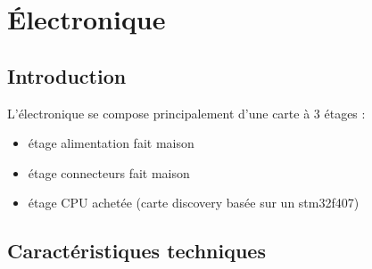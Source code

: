 \chapter{Électronique}

\section{Introduction}

L'électronique se compose principalement d'une carte à 3 étages :
\begin{itemize}
	\item étage alimentation fait maison
	\item étage connecteurs fait maison
	\item étage CPU achetée (carte discovery basée sur un stm32f407)
\end{itemize}

\section{Caractéristiques techniques}

